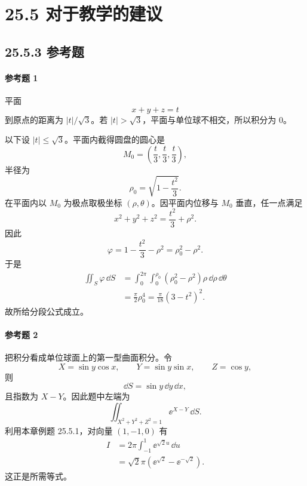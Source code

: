 \section*{25.5 对于教学的建议}

\subsection*{25.5.3 参考题}

\paragraph{参考题 1}
\begin{xsolution}
平面
\[
  x+y+z=t
\]
到原点的距离为 $|t|/\sqrt3$。若 $|t|>\sqrt3$，平面与单位球不相交，所以积分为 $0$。

以下设 $|t|\le\sqrt3$。平面内截得圆盘的圆心是
\[
  M_0=\left(\frac t3,\frac t3,\frac t3\right),
\]
半径为
\[
  \rho_0=\sqrt{1-\frac{t^2}{3}}.
\]
在平面内以 $M_0$ 为极点取极坐标 $(\rho,\theta)$。因平面内位移与 $M_0$ 垂直，任一点满足
\[
  x^2+y^2+z^2=\frac{t^2}{3}+\rho^2.
\]
因此
\[
  \varphi=1-\frac{t^2}{3}-\rho^2=\rho_0^2-\rho^2.
\]
于是
\begin{align*}
\iint_S\varphi\,\dd S
&=\int_0^{2\pi}\int_0^{\rho_0}(\rho_0^2-\rho^2)\rho\,\dd\rho\,\dd\theta\\
&=\frac\pi2\rho_0^4
=\frac\pi{18}(3-t^2)^2.
\end{align*}
故所给分段公式成立。
\end{xsolution}

\paragraph{参考题 2}
\begin{xsolution}
把积分看成单位球面上的第一型曲面积分。令
\[
  X=\sin y\cos x,\qquad Y=\sin y\sin x,\qquad Z=\cos y,
\]
则
\[
  \dd S=\sin y\,\dd y\,\dd x,
\]
且指数为 $X-Y$。因此题中左端为
\[
  \iint_{X^2+Y^2+Z^2=1}\ee^{X-Y}\,\dd S.
\]
利用本章例题 25.5.1，对向量 $(1,-1,0)$ 有
\begin{align*}
I
&=2\pi\int_{-1}^{1}\ee^{\sqrt2u}\,\dd u\\
&=\sqrt2\pi(\ee^{\sqrt2}-\ee^{-\sqrt2}).
\end{align*}
这正是所需等式。
\end{xsolution}

